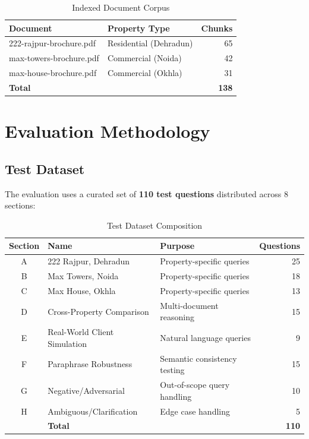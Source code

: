 \documentclass[11pt,a4paper]{article}
\begin{document}
\begin{table}[H]
\centering
\begin{tabular}{llr}
\toprule
\textbf{Document} & \textbf{Property Type} & \textbf{Chunks} \\
\midrule
222-rajpur-brochure.pdf & Residential (Dehradun) & 65 \\
max-towers-brochure.pdf & Commercial (Noida) & 42 \\
max-house-brochure.pdf & Commercial (Okhla) & 31 \\
\midrule
\textbf{Total} & & \textbf{138} \\
\bottomrule
\end{tabular}
\caption{Indexed Document Corpus}
\end{table}

\section{Evaluation Methodology}

\subsection{Test Dataset}

The evaluation uses a curated set of \textbf{110 test questions} distributed across 8 sections:

\begin{table}[H]
\centering
\begin{tabularx}{\textwidth}{clXr}
\toprule
\textbf{Section} & \textbf{Name} & \textbf{Purpose} & \textbf{Questions} \\
\midrule
A & 222 Rajpur, Dehradun & Property-specific queries & 25 \\
B & Max Towers, Noida & Property-specific queries & 18 \\
C & Max House, Okhla & Property-specific queries & 13 \\
D & Cross-Property Comparison & Multi-document reasoning & 15 \\
E & Real-World Client Simulation & Natural language queries & 9 \\
F & Paraphrase Robustness & Semantic consistency testing & 15 \\
G & Negative/Adversarial & Out-of-scope query handling & 10 \\
H & Ambiguous/Clarification & Edge case handling & 5 \\
\midrule
& \textbf{Total} & & \textbf{110} \\
\bottomrule
\end{tabularx}
\caption{Test Dataset Composition}
\end{table}
\end{document}
